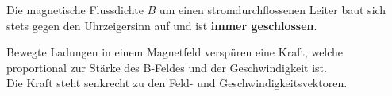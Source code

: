 \beginip
Die magnetische Flussdichte $B$ um einen stromdurchflossenen Leiter baut sich stets gegen den Uhrzeigersinn auf und ist \textbf{immer geschlossen}. \\
\begin{center}
\end{center}
\iend

\newpage
{}
\begingl
Bewegte Ladungen in einem Magnetfeld verspüren eine Kraft, welche proportional zur Stärke des B-Feldes und der Geschwindigkeit ist. \\
Die Kraft steht senkrecht zu den Feld- und Geschwindigkeitsvektoren.


\begin{center}
\end{center}

